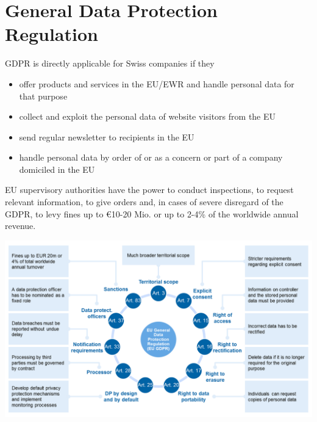 \documentclass[11pt]{article}
\theoremstyle{definition}
\begin{document}
\section{General Data Protection Regulation}
GDPR is directly applicable for Swiss companies if they
\begin{itemize}
	\item offer products and services in the EU/EWR and handle personal data for that purpose
	\item collect and exploit the personal data of website visitors from the EU
	\item send regular newsletter to recipients in the EU
	\item handle personal data by order of or as a concern or part of a company domiciled in the EU
\end{itemize}
EU supervisory authorities have the power to conduct inspections, to request relevant information, to give orders and, in cases of severe disregard of the GDPR, to levy fines up to €10-20 Mio. or up to 2-4\% of the worldwide annual revenue.

\begin{center}
	\includegraphics[width=0.9\linewidth]{img/gdpr_swiss_side}
\end{center}
\end{document}
